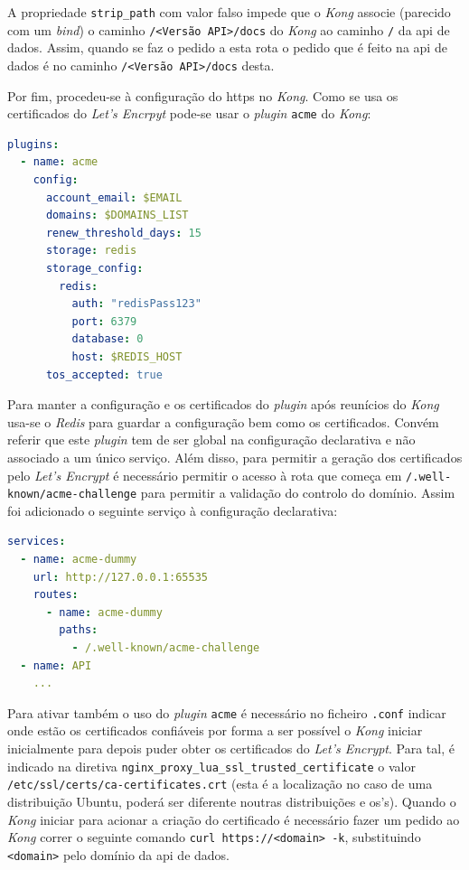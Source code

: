 A propriedade \texttt{strip\_path} com valor falso impede que o \textit{Kong} associe (parecido com um \textit{bind}) o caminho \texttt{/<Versão API>/docs} do \textit{Kong} ao caminho \texttt{/} da \acrshort{api} de dados. Assim, quando se faz o pedido a esta rota o pedido que é feito na \acrshort{api} de dados é no caminho \texttt{/<Versão API>/docs} desta. 

Por fim, procedeu-se à configuração do \acrshort{https} no \textit{Kong}. Como se usa os certificados do \textit{Let's Encrpyt} pode-se usar o \textit{plugin} \texttt{acme} do \textit{Kong}\cite{kongACME}:
\begin{lstlisting}[language=yaml, caption=Configuração declarativa do \textit{Kong}: \textit{plugin} \texttt{acme}]
plugins:
  - name: acme
    config:
      account_email: $EMAIL
      domains: $DOMAINS_LIST
      renew_threshold_days: 15
      storage: redis
      storage_config:
        redis:
          auth: "redisPass123"
          port: 6379
          database: 0
          host: $REDIS_HOST
      tos_accepted: true
\end{lstlisting}
Para manter a configuração e os certificados do \textit{plugin} após reunícios do \textit{Kong} usa-se o \textit{Redis} para guardar a configuração bem como os certificados. Convém referir que este \textit{plugin} tem de ser global na configuração declarativa e não associado a um único serviço. Além disso, para permitir a geração dos certificados pelo \textit{Let's Encrypt} é necessário permitir o acesso à rota que começa em \texttt{/.well-known/acme-challenge} para permitir a validação do controlo do domínio. Assim foi adicionado o seguinte serviço à configuração declarativa:
\begin{lstlisting}[language=yaml, caption=Configuração declarativa do \textit{Kong}: Serviço para a geração de certificados \acrshort{tls}]
services:
  - name: acme-dummy
    url: http://127.0.0.1:65535
    routes:
      - name: acme-dummy
        paths:
          - /.well-known/acme-challenge
  - name: API
    ...
\end{lstlisting}
Para ativar também o uso do \textit{plugin} \texttt{acme} é necessário no ficheiro \texttt{.conf} indicar onde estão os certificados confiáveis por forma a ser possível o \textit{Kong} iniciar inicialmente para depois puder obter os certificados do \textit{Let's Encrypt}. Para tal, é indicado na diretiva \texttt{nginx\_proxy\_lua\_ssl\_trusted\_certificate} o valor \texttt{/etc/ssl/certs/ca-certificates.crt} (esta é a localização no caso de uma distribuição Ubuntu, poderá ser diferente noutras distribuições e \acrshort{os}'s). Quando o \textit{Kong} iniciar para acionar a criação do certificado é necessário fazer um pedido ao \textit{Kong} correr o seguinte comando \verb|curl https://<domain> -k|, substituindo \verb|<domain>| pelo domínio da \acrshort{api} de dados.

